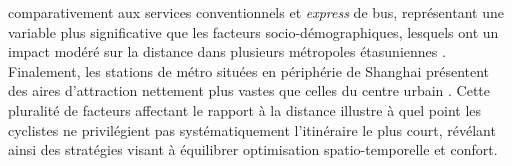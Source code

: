 \begin{refsegment}
comparativement aux services conventionnels et \textsl{express} de bus, représentant une variable plus significative que les facteurs socio-démographiques, lesquels ont un impact modéré sur la distance dans plusieurs métropoles étasuniennes \textcolor{blue}{\autocite[23-24]{hochmair_assessment_2015}}. Finalement, les stations de métro situées en périphérie de Shanghai présentent des aires d'attraction nettement plus vastes que celles du centre urbain \textcolor{blue}{\autocite[8]{yu_policy_2021}}. Cette pluralité de facteurs affectant le rapport à la distance illustre à quel point les cyclistes ne privilégient pas systématiquement l'itinéraire le plus court, révélant ainsi des stratégies visant à équilibrer optimisation spatio-temporelle et confort.%


\end{refsegment}
